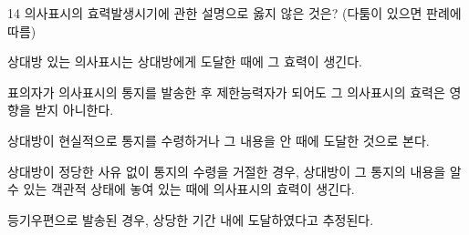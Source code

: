 \begin{question}{14}
의사표시의 효력발생시기에 관한 설명으로 옳지 않은 것은? (다툼이 있으면 판례에 따름)
\begin{choices}
  \item 상대방 있는 의사표시는 상대방에게 도달한 때에 그 효력이 생긴다.
  \item 표의자가 의사표시의 통지를 발송한 후 제한능력자가 되어도 그 의사표시의 효력은 영향을 받지 아니한다.
  \item 상대방이 현실적으로 통지를 수령하거나 그 내용을 안 때에 도달한 것으로 본다.
  \item 상대방이 정당한 사유 없이 통지의 수령을 거절한 경우, 상대방이 그 통지의 내용을 알 수 있는 객관적 상태에 놓여 있는 때에 의사표시의 효력이 생긴다.
  \item 등기우편으로 발송된 경우, 상당한 기간 내에 도달하였다고 추정된다.
\end{choices}
\end{question}
